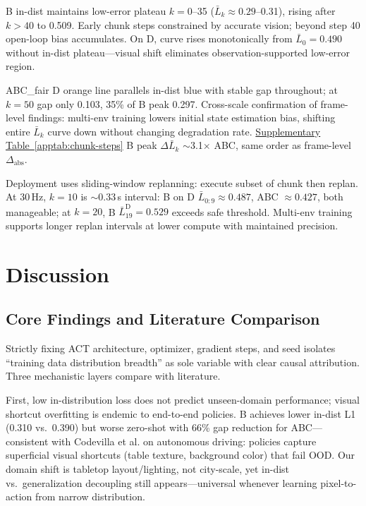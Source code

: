 \documentclass[10pt,twocolumn,letterpaper]{article}
\newcounter{apptab}
\newcommand{\apptabref}[1]{\hyperref[#1]{Supplementary Table~\ref*{#1}}}
\begin{document}
B in-dist maintains low-error plateau $k{=}0$--35 ($\bar{L}_k{\approx}0.29$--0.31), rising after $k{>}40$ to 0.509. Early chunk steps constrained by accurate vision; beyond step 40 open-loop bias accumulates. On D, curve rises monotonically from $\bar{L}_0{=}0.490$ without in-dist plateau---visual shift eliminates observation-supported low-error region.

ABC\_fair D orange line parallels in-dist blue with stable gap throughout; at $k{=}50$ gap only 0.103, 35\% of B peak 0.297. Cross-scale confirmation of frame-level findings: multi-env training lowers initial state estimation bias, shifting entire $\bar{L}_k$ curve down without changing degradation rate. \apptabref{apptab:chunk-steps} B peak $\Delta\bar{L}_k$ $\sim$3.1$\times$ ABC, same order as frame-level $\Delta_{\mathrm{abs}}$.

Deployment uses sliding-window replanning: execute subset of chunk then replan. At 30\,Hz, $k{=}10$ is $\sim$0.33\,s interval: B on D $\bar{L}_{0:9}{\approx}0.487$, ABC ${\approx}0.427$, both manageable; at $k{=}20$, B $\bar{L}_{19}^{\mathrm{D}}{=}0.529$ exceeds safe threshold. Multi-env training supports longer replan intervals at lower compute with maintained precision.

\section{Discussion}

\subsection{Core Findings and Literature Comparison}

Strictly fixing ACT architecture, optimizer, gradient steps, and seed isolates ``training data distribution breadth'' as sole variable with clear causal attribution. Three mechanistic layers compare with literature.

First, low in-distribution loss does not predict unseen-domain performance; visual shortcut overfitting is endemic to end-to-end policies. B achieves lower in-dist L1 (0.310 vs.\ 0.390) but worse zero-shot with 66\% gap reduction for ABC---consistent with Codevilla et al.\cite{codevilla2019exploring} on autonomous driving: policies capture superficial visual shortcuts (table texture, background color) that fail OOD. Our domain shift is tabletop layout/lighting, not city-scale, yet in-dist vs.\ generalization decoupling still appears---universal whenever learning pixel-to-action from narrow distribution.
\end{document}
